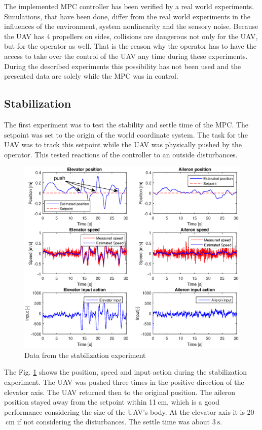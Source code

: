 \documentclass[a4paper,11pt,titlepage]{article}
\newcommand{\jed}[1]{\ensuremath{~\mathrm{#1}}}
\begin{document}
The implemented MPC controller has been verified by a real world experiments. Simulations, that have been done, differ from the real world experiments in the influences of the environment, system nonlinearity and the sensory noise. Because the UAV has 4 propellers on sides, collisions are dangerous not only for the UAV, but for the operator as well. That is the reason why the operator has to have the access to take over the control of the UAV any time during these experiments. During the described experiments this possibility has not been used and the presented data are solely while the MPC was in control.

\subsection{Stabilization}
The first experiment was to test the stability and settle time of the MPC. The setpoint was set to the origin of the world coordinate system. The task for the UAV was to track this setpoint while the UAV was physically pushed by the operator. This tested reactions of the controller to an outside disturbances.


\begin{figure}[h]
\centering
\includegraphics[width=1\textwidth]{fig/balancing.eps}
\caption{Data from the stabilization experiment}
\label{fig:stabilization}
\end{figure}

The Fig. \ref{fig:stabilization} shows the position, speed and input action during the stabilization experiment. The UAV was pushed three times in the positive direction of the elevator axis. The UAV returned then to the original position. The aileron position stayed away from the setpoint within 11\jed{cm}, which is a good performance considering the size of the UAV's body. At the elevator axis it is 20\jed{cm} if not considering the disturbances. The settle time was about 3\jed{s}.
\end{document}
